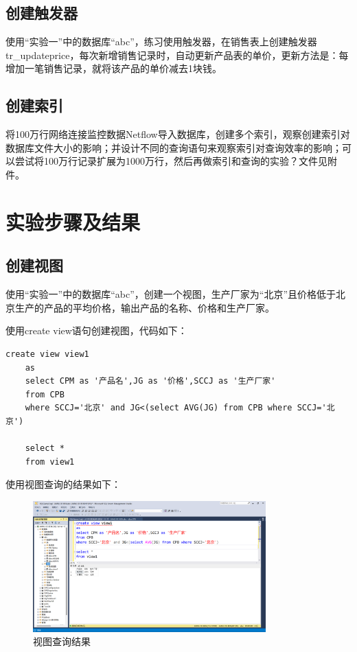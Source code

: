 \documentclass[UTF8,12pt]{article}
\begin{document}
\subsection{创建触发器}
使用“实验一”中的数据库“abc”，练习使用触发器，在销售表上创建触发器tr\_updateprice，每次新增销售记录时，自动更新产品表的单价，更新方法是：每增加一笔销售记录，就将该产品的单价减去1块钱。

\subsection{创建索引}
将100万行网络连接监控数据Netflow导入数据库，创建多个索引，观察创建索引对数据库文件大小的影响；并设计不同的查询语句来观察索引对查询效率的影响；可以尝试将100万行记录扩展为1000万行，然后再做索引和查询的实验？文件见附件。

\section{实验步骤及结果}
\subsection{创建视图}
使用“实验一”中的数据库“abc”，创建一个视图，生产厂家为“北京”且价格低于北京生产的产品的平均价格，输出产品的名称、价格和生产厂家。

使用create view语句创建视图，代码如下：
\begin{lstlisting}[title=create view,frame=shadowbox]
    create view view1
    as
    select CPM as '产品名',JG as '价格',SCCJ as '生产厂家'
    from CPB
    where SCCJ='北京' and JG<(select AVG(JG) from CPB where SCCJ='北京')
    
    select *
    from view1
\end{lstlisting}

使用视图查询的结果如下：
\begin{figure}[htbp]
    \centering
    \includegraphics[width=0.8\textwidth]{img/1.png}
    \caption{视图查询结果}
\end{figure}
\end{document}

